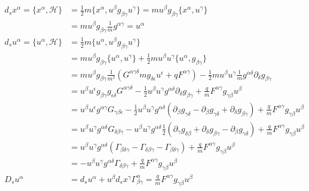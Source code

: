 \documentclass[11pt]{article}
\begin{document}
\begin{equation}
\begin{aligned}
d_s x^\alpha = \{x^\alpha, \mathcal{H}\} &= \frac{1}{2} m  \{x^\alpha, u^\beta g_{\beta\gamma} u^\gamma\} = m u^\beta g_{\beta \gamma} \{x^\alpha, u^\gamma\}\\
&= m u^\beta g_{\beta\gamma} \frac{1}{m} g^{\alpha\gamma} = u^\alpha \\
d_s u^\alpha = \{ u^\alpha , \mathcal{H} \} &= \frac{1}{2} m \{u^\alpha, u^\beta g_{\beta\gamma} u^\gamma\} \\
&=  m u^\beta g_{\beta\gamma} \{u^\alpha,  u^\gamma\} + \frac{1}{2} m u^\beta u^\gamma \{u^\alpha,  g_{\beta\gamma} \} \\
&= m u^\beta g_{\beta\gamma} \frac{1}{m^2} (G^{\alpha \gamma \delta} m g_{\delta \epsilon} u^\epsilon +  q F^{\alpha \gamma}) - \frac{1}{2} m u^\beta u^\gamma \frac{1}{m} g^{\alpha \delta} \partial_\delta g_{\beta\gamma} \\
&= u^\beta u^\epsilon g_{\beta\gamma} g_{\epsilon \delta} G^{\alpha \gamma \delta} - \frac{1}{2} u^\beta u^\gamma g^{\alpha \delta} \partial_\delta g_{\beta\gamma} + \frac{q}{m} F^{\alpha \gamma}g_{\gamma\beta}u^\beta \\
&= u^\beta u^\epsilon g^{\alpha\gamma} G_{\gamma \beta \epsilon} - \frac{1}{2} u^\beta u^\gamma g^{\alpha \delta} (\partial_\beta g_{\gamma\delta} - \partial_\beta g_{\gamma\delta} + \partial_\delta g_{\beta\gamma}) + \frac{q}{m} F^{\alpha \gamma}g_{\gamma\beta}u^\beta \\
&= u^\beta u^\gamma g^{\alpha\delta} G_{\delta \beta \gamma} -  u^\beta u^\gamma g^{\alpha \delta} \frac{1}{2} (\partial_\gamma g_{\delta\beta} + \partial_\delta g_{\beta\gamma} - \partial_\beta g_{\gamma\delta}) + \frac{q}{m} F^{\alpha \gamma}g_{\gamma\beta}u^\beta \\
&= u^\beta u^\gamma g^{\alpha\delta} (\Gamma_{\beta \delta \gamma} - \Gamma_{\delta \beta \gamma} - \Gamma_{\beta \delta \gamma}) + \frac{q}{m} F^{\alpha \gamma}g_{\gamma\beta}u^\beta \\
&= - u^\beta u^\gamma g^{\alpha\delta} \Gamma_{\delta \beta \gamma} + \frac{q}{m} F^{\alpha \gamma}g_{\gamma\beta}u^\beta \\
D_s u^\alpha &= d_s u^\alpha + u^\beta d_sx^\gamma \Gamma^\alpha_{\beta\gamma} = \frac{q}{m} F^{\alpha \gamma}g_{\gamma\beta}u^\beta \\
\end{aligned}
\end{equation}

\begin{thebibliography}{0}
	
\end{thebibliography}
\end{document}
